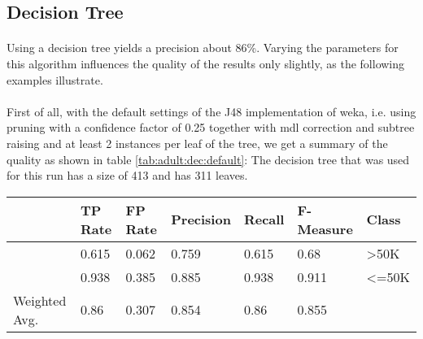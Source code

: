 \documentclass[paper=a4, fontsize=11pt]{scrartcl} %
\numberwithin{equation}{section} %
\numberwithin{figure}{section} %
\numberwithin{table}{section} %
\begin{document}
\subsection{Decision Tree}
\paragraph{}Using a decision tree yields a precision about 86\%. Varying the parameters for this algorithm influences the quality of the results only slightly, as the following examples illustrate.

\paragraph{}First of all, with the default settings of the J48 implementation of weka, i.e. using pruning with a confidence factor of 0.25 together with mdl correction and subtree raising and at least 2 instances per leaf of the tree, we get a summary of the quality as shown in table \ref{tab:adult:dec:default}:
The decision tree that was used for this run has a size of 413 and has 311 leaves.

\begin{table*}[htb]\centering
    \begin{tabular*}{\columnwidth}{@{}lllllll@{}}
        \toprule 
               & TP Rate & FP Rate & Precision & Recall &  F-Measure &  Class \\ \midrule  
               & 0.615   & 0.062   & 0.759     & 0.615  &  0.68      &  >50K  \\  
               & 0.938   & 0.385   & 0.885     & 0.938  &  0.911     &  <=50K \\  
Weighted Avg.  & 0.86    & 0.307   & 0.854     & 0.86   &  0.855     &        \\  \bottomrule 
    \end{tabular*}
\caption{Decision Tree -- Default Settings} 
\label{tab:adult:dec:default}
\end{table*}
\FloatBarrier
\end{document}
